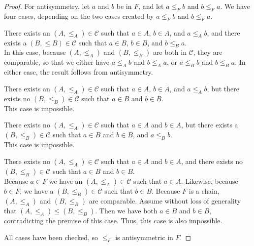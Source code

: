 \documentclass[../math.tex]{subfiles}
\begin{document}
\begin{proof}
    For antisymmetry, let $a$ and $b$ be in $F$, and let $a \leq_F b$ and $b
    \leq_F a$.  We have four cases, depending on the two cases created by
    $a \leq_F b$ and $b \leq_F a$.
    \begin{case} There exists an $(A, \leq_A) \in \mathcal C$ such that $a \in
    A$, $b \in A$, and $a \leq_A b$, and there exists a $(B, \leq B) \in
    \mathcal C$ such that $a \in B$, $b \in B$, and $b \leq_B a$. \\
        \indent In this case, because $(A, \leq_A)$ and $(B, \leq_B)$ are both
        in $\mathcal C$, they are comparable, so that we either have $a \leq_A
        b$ and $b \leq_A a$, or $a \leq_B b$ and $b \leq_B a$.  In either case,
        the result follows from antisymmetry.
    \end{case}
    \begin{case} There exists an $(A, \leq_A) \in \mathcal C$ such that $a \in
    A$, $b \in A$, and $a \leq_A b$, but there exists no $(B, \leq_B) \in
    \mathcal C$ such that $a \in B$ and $b \in B$. \\
        \indent This case is impossible.
    \end{case}
    \begin{case} There exists no $(A, \leq_A) \in \mathcal C$ such that $a \in
    A$ and $b \in A$, but there exists a $(B, \leq_B) \in \mathcal C$ such that
    $a \in B$ and $b \in B$, and $a \leq_B b$. \\
        \indent This case is impossible.
    \end{case}
    \begin{case} There exists no $(A, \leq_A) \in \mathcal C$ such that $a \in
    A$ and $b \in A$, and there exists no $(B, \leq_B) \in \mathcal C$ such that
    $a \in B$ and $b \in B$. \\
        \indent Because $a \in F$ we have an $(A, \leq_A) \in \mathcal C$ such
        that $a \in A$.  Likewise, because $b \in F$, we have a $(B, \leq_B) \in
        \mathcal C$ such that $b \in B$.  Because $F$ is a chain, $(A, \leq_A)$
        and $(B, \leq_B)$ are comparable.  Assume without loss of generality
        that $(A, \leq_A) \leq (B, \leq_B)$.  Then we have both $a \in B$ and $b
        \in B$, contradicting the premise of this case.  Thus, this case is also
        impossible.
    \end{case}
    \noindent All cases have been checked, so $\leq_F$ is antisymmetric in $F$.


\end{proof}
\end{document}
